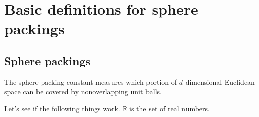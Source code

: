 %

\section{Basic definitions for sphere packings}
\subsection{Sphere packings}
The sphere packing constant measures which portion of $d$-dimensional Euclidean space can be covered by nonoverlapping unit balls.

Let's see if the following things work. $\mathbb{R}$ is the set of real numbers.
